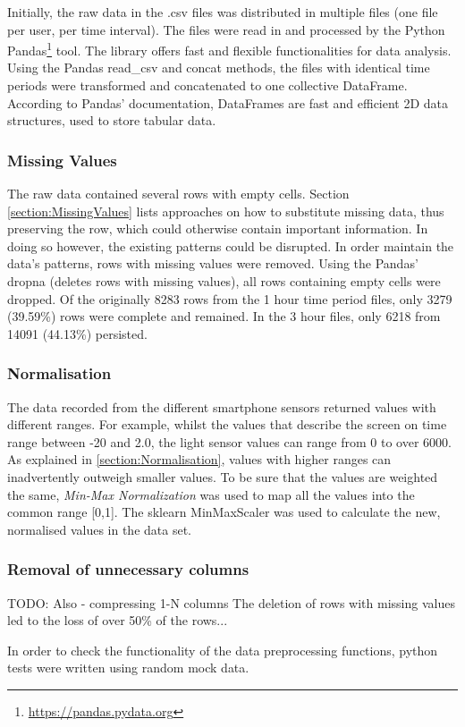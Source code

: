 Initially, the raw data in the .csv files was distributed in multiple files (one file per user, per time interval). The files were read in and processed by the Python Pandas\footnote{\url{https://pandas.pydata.org}} tool. The library offers fast and flexible functionalities for data analysis. Using the Pandas read\_csv and concat methods, the files with identical time periods were transformed and concatenated to one collective DataFrame. According to Pandas' documentation, DataFrames are fast and efficient 2D data structures, used to store tabular data. 


\subsubsection{Missing Values}
The raw data contained several rows with empty cells. Section \ref{section:MissingValues} lists approaches on how to substitute missing data, thus preserving the row, which could otherwise contain important information. In doing so however, the existing patterns could be disrupted. In order maintain the data's patterns, rows with missing values were removed. Using the Pandas' dropna (deletes rows with missing values), all rows containing empty cells were dropped. Of the originally 8283 rows from the 1 hour time period files, only 3279 (39.59\%) rows were complete and remained. In the 3 hour files, only 6218 from 14091 (44.13\%) persisted.

\subsubsection{Normalisation}
The data recorded from the different smartphone sensors returned values with different ranges. For example, whilst the values that describe the screen on time range between -20 and 2.0, the light sensor values can range from 0 to over 6000. As explained in \ref{section:Normalisation}, values with higher ranges can inadvertently outweigh smaller values. To be sure that the values are weighted the same, \textit{Min-Max Normalization} was used to map all the values into the common range [0,1]. The sklearn MinMaxScaler was used to calculate the new, normalised values in the data set.

\subsubsection{Removal of unnecessary columns}
TODO:
Also - compressing 1-N columns
The deletion of rows with missing values led to the loss of over 50\% of the rows...


In order to check the functionality of the data preprocessing functions, python tests were written using random mock data.